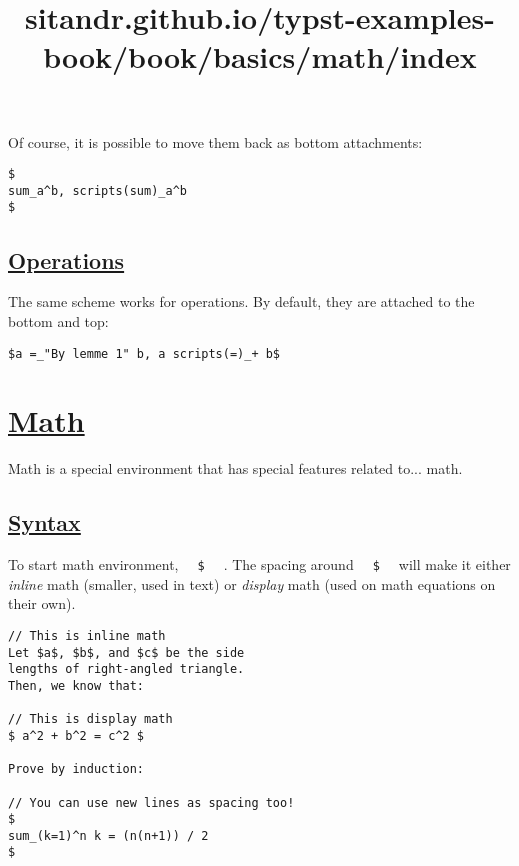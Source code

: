 \pandocbounded{}

Of course, it is possible to move them back as bottom attachments:

\begin{verbatim}
$
sum_a^b, scripts(sum)_a^b
$
\end{verbatim}

\pandocbounded{}

\subsection{\texorpdfstring{\hyperref[operations]{Operations}}{Operations}}\label{operations}

The same scheme works for operations. By default, they are attached to
the bottom and top:

\begin{verbatim}
$a =_"By lemme 1" b, a scripts(=)_+ b$
\end{verbatim}

\pandocbounded{}


\title{sitandr.github.io/typst-examples-book/book/basics/math/index}

\section{\texorpdfstring{\hyperref[math]{Math}}{Math}}\label{math}

Math is a special environment that has special features related to...
math.

\subsection{\texorpdfstring{\hyperref[syntax]{Syntax}}{Syntax}}\label{syntax}

To start math environment, \texttt{\ }{\texttt{\ \$\ }}\texttt{\ } . The
spacing around \texttt{\ }{\texttt{\ \$\ }}\texttt{\ } will make it
either \emph{inline} math (smaller, used in text) or \emph{display} math
(used on math equations on their own).

\begin{verbatim}
// This is inline math
Let $a$, $b$, and $c$ be the side
lengths of right-angled triangle.
Then, we know that:

// This is display math
$ a^2 + b^2 = c^2 $

Prove by induction:

// You can use new lines as spacing too!
$
sum_(k=1)^n k = (n(n+1)) / 2
$
\end{verbatim}


